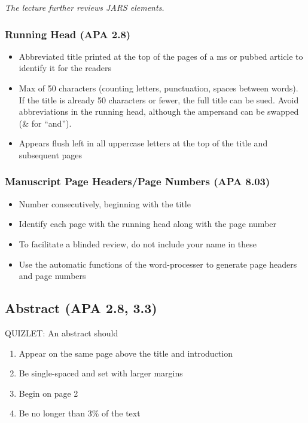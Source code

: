 \documentclass[
  11pt,
]{book}
\providecommand{\tightlist}{%
  \setlength{\itemsep}{0pt}\setlength{\parskip}{0pt}}
\begin{document}
\emph{The lecture further reviews JARS elements.}

\hypertarget{running-head-apa-2.8}{%
\subsubsection{Running Head (APA 2.8)}\label{running-head-apa-2.8}}

\begin{itemize}
\tightlist
\item
  Abbreviated title printed at the top of the pages of a ms or pubbed article to identify it for the readers
\item
  Max of 50 characters (counting letters, punctuation, spaces between words). If the title is already 50 characters or fewer, the full title can be sued. Avoid abbreviations in the running head, although the ampersand can be swapped (\& for ``and'').
\item
  Appears flush left in all uppercase letters at the top of the title and subsequent pages
\end{itemize}

\hypertarget{manuscript-page-headerspage-numbers-apa-8.03}{%
\subsubsection{Manuscript Page Headers/Page Numbers (APA 8.03)}\label{manuscript-page-headerspage-numbers-apa-8.03}}

\begin{itemize}
\tightlist
\item
  Number consecutively, beginning with the title
\item
  Identify each page with the running head along with the page number
\item
  To facilitate a blinded review, do not include your name in these
\item
  Use the automatic functions of the word-processer to generate page headers and page numbers
\end{itemize}

\hypertarget{abstract-apa-2.8-3.3}{%
\subsection{Abstract (APA 2.8, 3.3)}\label{abstract-apa-2.8-3.3}}

QUIZLET:
An abstract should

\begin{enumerate}
\def\labelenumi{\alph{enumi}.}
\tightlist
\item
  Appear on the same page above the title and introduction
\item
  Be single-spaced and set with larger margins
\item
  Begin on page 2
\item
  Be no longer than 3\% of the text
\end{enumerate}
\end{document}
